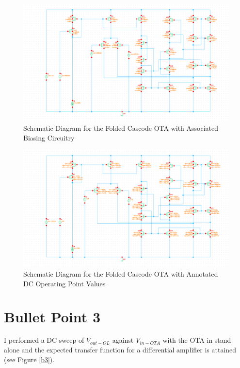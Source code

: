 \documentclass{article}
\begin{document}
\begin{figure}[H]
\centering
\includegraphics[width=6in]{bullet2_schem.png}
\caption{Schematic Diagram for the Folded Cascode OTA with Associated Biasing Circuitry}
\label{b2_schem}
\end{figure}

\begin{figure}[H]
\centering
\includegraphics[width=6in]{bullet2_dcop.png}
\caption{Schematic Diagram for the Folded Cascode OTA with Annotated DC Operating Point Values}
\label{b2_dcop}
\end{figure}
\newpage

\section{Bullet Point 3}
I performed a DC sweep of $V_{out-OL}$ against $V_{in-OTA}$ with the OTA in stand alone and the expected transfer function for a differential amplifier is attained (see Figure \ref{b3}).
\end{document}
